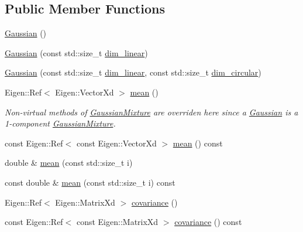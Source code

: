 \subsection*{Public Member Functions}
\begin{DoxyCompactItemize}
\item 
\mbox{\hyperlink{classbfl_1_1Gaussian_aa201bf4a8fe1192c9a701e9537691426}{Gaussian}} ()
\item 
\mbox{\hyperlink{classbfl_1_1Gaussian_aa096285a5065804c2f0838135de47875}{Gaussian}} (const std\+::size\+\_\+t \mbox{\hyperlink{classbfl_1_1GaussianMixture_a22a0fbc77f90d9d75e89d7898484c05a}{dim\+\_\+linear}})
\item 
\mbox{\hyperlink{classbfl_1_1Gaussian_a99507926f6b8df85b6a512c21afe2b50}{Gaussian}} (const std\+::size\+\_\+t \mbox{\hyperlink{classbfl_1_1GaussianMixture_a22a0fbc77f90d9d75e89d7898484c05a}{dim\+\_\+linear}}, const std\+::size\+\_\+t \mbox{\hyperlink{classbfl_1_1GaussianMixture_a23f3b92753266475a9bff8ee7e1c9518}{dim\+\_\+circular}})
\item 
Eigen\+::\+Ref$<$ Eigen\+::\+Vector\+Xd $>$ \mbox{\hyperlink{classbfl_1_1Gaussian_a31c06392bcbcc31d576e148001b681a0}{mean}} ()
\begin{DoxyCompactList}\small\item\em Non-\/virtual methods of \mbox{\hyperlink{classbfl_1_1GaussianMixture}{Gaussian\+Mixture}} are overriden here since a \mbox{\hyperlink{classbfl_1_1Gaussian}{Gaussian}} is a 1-\/component \mbox{\hyperlink{classbfl_1_1GaussianMixture}{Gaussian\+Mixture}}. \end{DoxyCompactList}\item 
const Eigen\+::\+Ref$<$ const Eigen\+::\+Vector\+Xd $>$ \mbox{\hyperlink{classbfl_1_1Gaussian_a1b9b1727e467cc671cbf5487c00c9b20}{mean}} () const
\item 
double \& \mbox{\hyperlink{classbfl_1_1Gaussian_aa19856ef77d8d6599ff22884174eda9a}{mean}} (const std\+::size\+\_\+t i)
\item 
const double \& \mbox{\hyperlink{classbfl_1_1Gaussian_a025d3985d2390300f2b999b71f1a2e3c}{mean}} (const std\+::size\+\_\+t i) const
\item 
Eigen\+::\+Ref$<$ Eigen\+::\+Matrix\+Xd $>$ \mbox{\hyperlink{classbfl_1_1Gaussian_a23dbc924dadc0061c392a7435eb3befe}{covariance}} ()
\item 
const Eigen\+::\+Ref$<$ const Eigen\+::\+Matrix\+Xd $>$ \mbox{\hyperlink{classbfl_1_1Gaussian_a696a82cf8c335970e5280010f5b8bc9f}{covariance}} () const
\item 

\end{DoxyCompactItemize}
